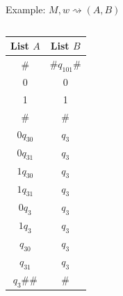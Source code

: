\documentclass[handout]{beamer}
\begin{document}
\begin{frame}{Example: $M,w\rightsquigarrow(A,B)$}
\begin{columns}
        \begin{tabular}{cc|}
            List $A$ & List $B$\\
            \hline
            \# & \#$q_101$\#\\
            0 & 0\\
            1 & 1\\
            \# & \#\\
            \hline
            $0q_30$ & $q_3$ \\
            $0q_31$ & $q_3$ \\
            $1q_30$ & $q_3$ \\
            $1q_31$ & $q_3$ \\
            $0q_3$ & $q_3$ \\
            $1q_3$ & $q_3$ \\
            $q_30$ & $q_3$ \\
            $q_31$ & $q_3$ \\
            \hline
            $q_3\#\#$ & $\#$\\
            \hline
        \end{tabular}
        
    \end{columns}
    
\end{frame}
\end{document}

